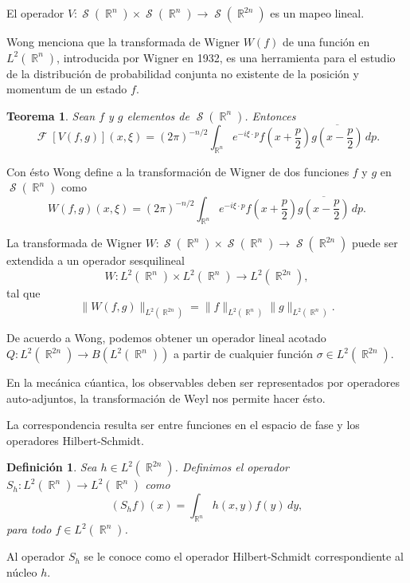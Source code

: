 \documentclass[a4paper]{report}
\DeclareMathOperator{\R}{\mathbb{R}}
\DeclareMathOperator{\Sz}{\mathcal S}
\DeclareMathOperator{\F}{\mathcal{F}}
\newtheorem{definition}{Definición}
\newtheorem{theorem}{Teorema}
\begin{document}
  El operador $V : \Sz(\R^{n}) \times \Sz(\R^{n}) \to
  \Sz(\R^{2n})$ es un mapeo lineal.

  Wong menciona que la transformada de Wigner $W(f)$ de una
  función en $L^2(\R^{n})$, introducida por Wigner en 1932,
  es una herramienta para el estudio de la distribución de
  probabilidad conjunta no existente de la posición y
  momentum de un estado $f$.

  \begin{theorem}
    Sean $f$ y $g$ elementos de $\Sz(\R^{n})$. Entonces
    \begin{equation}
      \F[V(f,g)](x,\xi)
      = (2\pi)^{-n / 2} \int_{\R^{n}} e^{-i \xi \cdot p
      } f\left( x + \frac{p}{2} \right)
      \overline{g\left( x - \frac{p}{2} \right)} \, dp.
    \end{equation}
  \end{theorem}

  Con ésto Wong define a la transformación de Wigner de dos
  funciones $f$ y $g$ en $\Sz(\R^{n})$ como
  \begin{equation}
    W(f,g)(x,\xi)
    = (2\pi)^{-n / 2} \int_{\R^{n}} e^{-i\xi \cdot p}
    f\left( x + \frac{p}{2} \right) \overline{g\left( x -
    \frac{p}{2} \right) } \, dp.
  \end{equation}

  La transformada de Wigner $W : \Sz(\R^{n}) \times
  \Sz(\R^{n}) \to \Sz(\R^{2n})$ puede ser extendida a un
  operador sesquilineal
  \[
    W : L^2(\R^{n}) \times L^2(\R^{n}) \to L^2(\R^{2n}),
  \] 
  tal que
  \[
    \|W(f,g)\|_{L^2(\R^{2n})}
    = \|f\|_{L^2(\R^{n})} \|g\|_{L^2(\R^{n})}.
  \] 

  De acuerdo a Wong, podemos obtener un operador lineal
  acotado $Q : L^2(\R^{2n}) \to B(L^2(\R^{n}))$ a partir de
  cualquier función $\sigma \in L^2(\R^{2n})$.

  En la mecánica cúantica, los observables deben ser
  representados por operadores auto-adjuntos, la
  transformación de Weyl nos permite hacer ésto.

  La correspondencia resulta ser entre funciones en el
  espacio de fase y los operadores Hilbert-Schmidt.

  \begin{definition}
    Sea $h \in L^2(\R^{2n})$. Definimos el operador $S_h :
    L^2(\R^{n}) \to L^2(\R^{n})$ como
    \begin{equation}
      (S_hf)(x)
      = \int_{\R^{n}} h(x,y) f(y) \, dy,
    \end{equation}
    para todo $f \in L^2(\R^{n})$.
  \end{definition}
  Al operador $S_h$ se le conoce como el operador
  Hilbert-Schmidt correspondiente al núcleo $h$.
\end{document}
